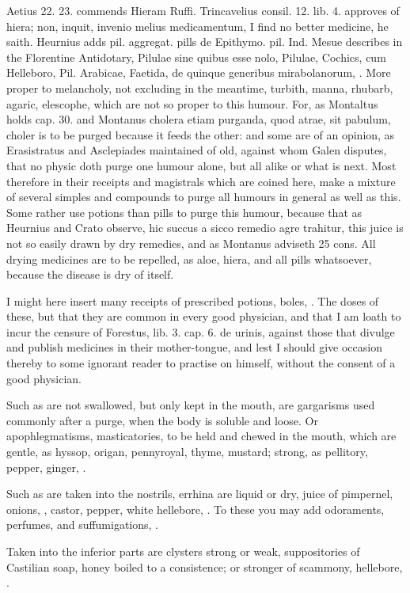 {Aetius 22. 23. commends Hieram Ruffi. Trincavelius consil. 12. lib. 4.
approves of hiera; non, inquit, invenio melius medicamentum, I find no
better medicine, he saith. Heurnius adds pil. aggregat. pills de
Epithymo. pil. Ind. Mesue describes in the Florentine Antidotary,
Pilulae sine quibus esse nolo, Pilulae, Cochics, cum Helleboro, Pil.
Arabicae, Faetida, de quinque generibus mirabolanorum, \etc{}. More proper
to melancholy, not excluding in the meantime, turbith, manna, rhubarb,
agaric, elescophe, \etc{} which are not so proper to this humour. For, as
Montaltus holds cap. 30. and Montanus cholera etiam purganda, quod
atrae, sit pabulum, choler is to be purged because it feeds the other:
and some are of an opinion, as Erasistratus and Asclepiades maintained
of old, against whom Galen disputes, that no physic doth purge
one humour alone, but all alike or what is next. Most therefore in
their receipts and magistrals which are coined here, make a mixture of
several simples and compounds to purge all humours in general as well
as this. Some rather use potions than pills to purge this humour,
because that as Heurnius and Crato observe, hic succus a sicco remedio
agre trahitur, this juice is not so easily drawn by dry remedies, and
as Montanus adviseth 25 cons. All drying medicines are to be
repelled, as aloe, hiera, and all pills whatsoever, because the disease
is dry of itself.

I might here insert many receipts of prescribed potions, boles, \etc{}. The
doses of these, but that they are common in every good physician, and
that I am loath to incur the censure of Forestus, lib. 3. cap. 6. de
urinis, against those that divulge and publish medicines in their
mother-tongue, and lest I should give occasion thereby to some ignorant
reader to practise on himself, without the consent of a good physician.

Such as are not swallowed, but only kept in the mouth, are gargarisms
used commonly after a purge, when the body is soluble and loose. Or
apophlegmatisms, masticatories, to be held and chewed in the mouth,
which are gentle, as hyssop, origan, pennyroyal, thyme, mustard;
strong, as pellitory, pepper, ginger, \etc{}.

Such as are taken into the nostrils, errhina are liquid or dry, juice
of pimpernel, onions, \etc{}, castor, pepper, white hellebore, \etc{}. To
these you may add odoraments, perfumes, and suffumigations, \etc{}.

Taken into the inferior parts are clysters strong or weak,
suppositories of Castilian soap, honey boiled to a consistence; or
stronger of scammony, hellebore, \etc{}.

}
